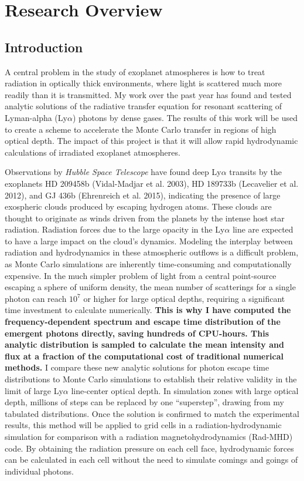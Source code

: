 \documentclass[onecolumn]{aastex63}
\begin{document}
\section{Research Overview} \label{researchoverview}

\subsection{Introduction}

 A central problem in the study of exoplanet atmospheres is how to treat radiation in optically thick environments, where light is scattered much more readily than it is transmitted. My work over the past year has found and tested analytic solutions of the radiative transfer equation for resonant scattering of Lyman-alpha (Ly$\alpha$) photons by dense gases. The results of this work will be used to create a scheme to accelerate the Monte Carlo transfer in regions of high optical depth. The impact of this project is that it will allow rapid hydrodynamic calculations of irradiated exoplanet atmospheres.

Observations by \textit{Hubble Space Telescope} have found deep Ly$\alpha$ transits by the exoplanets HD 209458b (Vidal-Madjar et al. 2003), HD 189733b (Lecavelier et al. 2012), and  GJ 436b (Ehrenreich et al. 2015), indicating the presence of large exospheric clouds produced by escaping hydrogen atoms. These clouds are thought to originate as winds driven from the planets by the intense host star radiation. Radiation forces due to the large opacity in the Ly$\alpha$ line are expected to have a large impact on the cloud's dynamics. Modeling the interplay between radiation and hydrodynamics in these atmospheric outflows is a difficult problem, as Monte Carlo simulations are inherently time-consuming and computationally expensive. In the much simpler problem of light from a central point-source escaping a sphere of uniform density, the mean number of scatterings for a single photon can reach $10^{7}$ or higher for large optical depths, requiring a significant time investment to calculate numerically. \textbf{This is why I have computed the frequency-dependent spectrum and escape time distribution of the emergent photons directly, saving hundreds of CPU-hours. This analytic distribution is sampled to calculate the mean intensity and flux at a fraction of the computational cost of traditional numerical methods.} I compare these new analytic solutions for photon escape time distributions to Monte Carlo simulations to establish their relative validity in the limit of large Ly$\alpha$ line-center optical depth. In simulation zones with large optical depth, millions of steps can be replaced by one ``superstep'', drawing from my tabulated distributions. Once the solution is confirmed to match the experimental results, this method will be applied to grid cells in a radiation-hydrodynamic simulation for comparison with a radiation magnetohydrodynamics (Rad-MHD) code. By obtaining the radiation pressure on each cell face, hydrodynamic forces can be calculated in each cell without the need to simulate comings and goings of individual photons.
\end{document}
